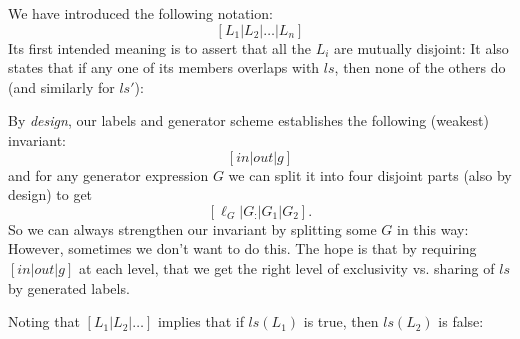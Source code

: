 \newpage
{}

We have introduced the following notation:
\[
  [ L_1 | L_2 | \dots | L_n ]
\]
Its first intended meaning is to assert that
all the $L_i$ are mutually disjoint:
It also states that if any one of its members overlaps with $ls$,
then none of the others do (and similarly for $ls'$):

By \emph{design}, our labels and generator scheme
establishes the following (weakest) invariant:
\[ [in|out|g]\]
and for any generator expression $G$ we can split it into
four disjoint parts (also by design) to get
\[  [\ell_G|G_{:}|G_1|G_2] . \]
So we can always strengthen our invariant by splitting some $G$
in this way:
However, sometimes we don't want to do this.
The hope is that by requiring $[in|out|g]$ at each level,
that we get the right level of exclusivity vs. sharing of $ls$
by generated labels.







Noting that $[L_1|L_2|\dots]$ implies that if $ls(L_1)$ is true,
then $ls(L_2)$ is false:


